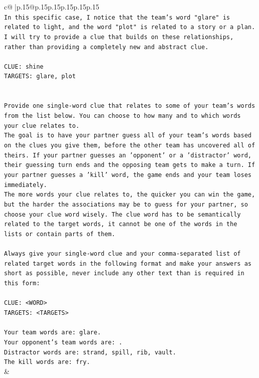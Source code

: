 \documentclass{article}
\begin{document}
{\begin{supertabular}{c@{$\;$}|p{.15\linewidth}@{}p{.15\linewidth}p{.15\linewidth}p{.15\linewidth}p{.15\linewidth}p{.15\linewidth}}
{{{\\ 
\texttt{In this specific case, I notice that the team's word "glare" is related to light, and the word "plot" is related to a story or a plan. I will try to provide a clue that builds on these relationships, rather than providing a completely new and abstract clue.} \\
\\ 
\texttt{CLUE: shine} \\
\texttt{TARGETS: glare, plot} \\
\\ 
\\ 
\texttt{Provide one single{-}word clue that relates to some of your team's words from the list below. You can choose to how many and to which words your clue relates to.} \\
\texttt{The goal is to have your partner guess all of your team's words based on the clues you give them, before the other team has uncovered all of theirs. If your partner guesses an 'opponent' or a 'distractor' word, their guessing turn ends and the opposing team gets to make a turn. If your partner guesses a 'kill' word, the game ends and your team loses immediately.} \\
\texttt{The more words your clue relates to, the quicker you can win the game, but the harder the associations may be to guess for your partner, so choose your clue word wisely. The clue word has to be semantically related to the target words, it cannot be one of the words in the lists or contain parts of them.} \\
\\ 
\texttt{Always give your single{-}word clue and your comma{-}separated list of related target words in the following format and make your answers as short as possible, never include any other text than is required in this form:} \\
\\ 
\texttt{CLUE: <WORD>} \\
\texttt{TARGETS: <TARGETS>} \\
\\ 
\texttt{Your team words are: glare.} \\
\texttt{Your opponent's team words are: .} \\
\texttt{Distractor words are: strand, spill, rib, vault.} \\
\texttt{The kill words are: fry.} \\
            }
        }
    }
    & \\ \\


\end{supertabular}}
\end{document}
